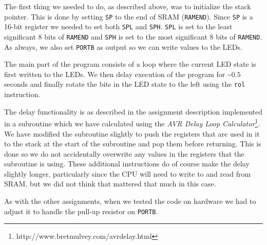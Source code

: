 The first thing we needed to do, as described above, was to initialize the stack pointer. This is done by setting \texttt{SP} to the end of SRAM (\texttt{RAMEND}). Since \texttt{SP} is a 16-bit register we needed to set both \texttt{SPL} and \texttt{SPH}. \texttt{SPL} is set to the least significant 8 bits of \texttt{RAMEND} and \texttt{SPH} is set to the most significant 8 bits of \texttt{RAMEND}. As always, we also set \texttt{PORTB} as output so we can write values to the LEDs.

The main part of the program consists of a loop where the current LED state is first written to the LEDs. We then delay execution of the program for \textasciitilde $0.5$ seconds and finally rotate the bits in the LED state to the left using the \texttt{rol} instruction. 

The delay functionality is as described in the assignment description implemented in a subroutine which we have calculated using the \emph{AVR Delay Loop Calculator}\footnote{http://www.bretmulvey.com/avrdelay.html}. We have modified the subroutine slightly to push the registers that are used in it to the stack at the start of the subroutine and pop them before returning. This is done so we do not accidentally overwrite any values in the registers that the subroutine is using. These additional instructions do of course make the delay slightly longer, particularly since the CPU will need to write to and read from SRAM, but we did not think that mattered that much in this case.

As with the other assignments, when we tested the code on hardware we had to adjust it to handle the pull-up resistor on \texttt{PORTB}.
